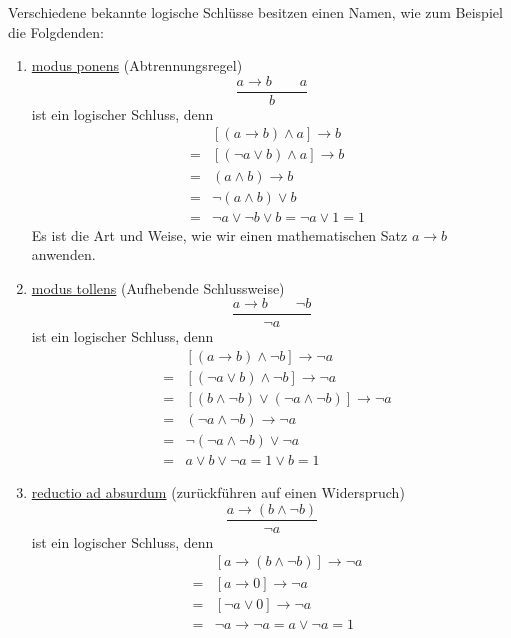 \documentclass{report}
\begin{document}
Verschiedene bekannte logische Schlüsse besitzen einen Namen, wie zum Beispiel die Folgdenden:
\begin{enumerate}
\item \underline{modus ponens} (Abtrennungsregel)
\begin{equation}\frac{a \to b \quad\quad a}{b}\end{equation}
ist ein logischer Schluss, denn
\begin{eqnarray}& &[(a \to b) \land a] \to b \nonumber \\
&=&[(\lnot a \lor b) \land a] \to b \nonumber \\
&=&(a \land b) \to b \nonumber \\
&=&\lnot (a \land b) \lor b \nonumber \\
&=&\lnot a \lor \lnot b \lor b = \lnot a \lor 1 = 1\end{eqnarray}
Es ist die Art und Weise, wie wir einen mathematischen Satz $a \to b$ anwenden.
\item \underline{modus tollens} (Aufhebende Schlussweise)
\begin{equation}\frac{a \to b \quad\quad \lnot b}{\lnot a}\end{equation}
ist ein logischer Schluss, denn
\begin{eqnarray}& &[(a \to b) \land \lnot b] \to \lnot a \nonumber \\
&=&[(\lnot a \lor b) \land \lnot b] \to \lnot a \nonumber \\
&=&[(b \land \lnot b) \lor (\lnot a \land \lnot b)] \to \lnot a \nonumber \\
&=&(\lnot a \land \lnot b) \to \lnot a \nonumber \\
&=&\lnot (\lnot a \land \lnot b) \lor \lnot a \nonumber \\
&=&a \lor b \lor \lnot a = 1 \lor b = 1\end{eqnarray}
\item \underline{reductio ad absurdum} (zurückführen auf einen Widerspruch)
\begin{equation} \frac{a \to (b \land \lnot b)}{\lnot a}\end{equation}
ist ein logischer Schluss, denn
\begin{eqnarray}& &[a \to (b \land \lnot b)] \to \lnot a \nonumber \\
&=&[a \to 0] \to \lnot a \nonumber \\
&=&[\lnot a \lor 0] \to \lnot a \nonumber \\
&=&\lnot a \to \lnot a = a \lor \lnot a = 1\end{eqnarray}

\end{enumerate}
\end{document}
